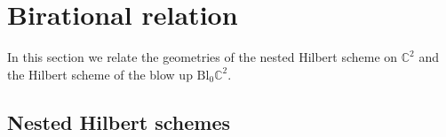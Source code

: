\documentclass[12pt]{amsart}
\newcommand{\C}{\mathbb{C}}
\newcommand{\CL}{\mathcal{L}}
\newcommand{\CO}{\mathcal{O}}
\numberwithin{equation}{section}
\theoremstyle{definition}
\begin{document}










\section{Birational relation}
\label{sec:birational-relation}
In this section we relate the geometries of the nested  Hilbert scheme on \(\C^2\) and the Hilbert scheme of the blow up \(\mathrm{Bl}_0\C^2\). %

\subsection{Nested Hilbert schemes}
\end{document}
